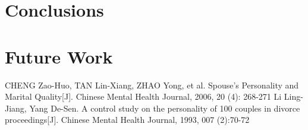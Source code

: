 \section{Conclusions}
   
\section{Future Work}

\begin{thebibliography}{99}               
     CHENG Zao-Huo, TAN Lin-Xiang, ZHAO Yong, et al. Spouse's Personality and Marital Quality[J]. Chinese Mental Health Journal, 2006, 20 (4): 268-271
     Li Ling-Jiang, Yang De-Sen. A control study on the personality of 100 couples in divorce proceedings[J]. Chinese Mental Health Journal, 1993, 007 (2):70-72
\end{thebibliography}

